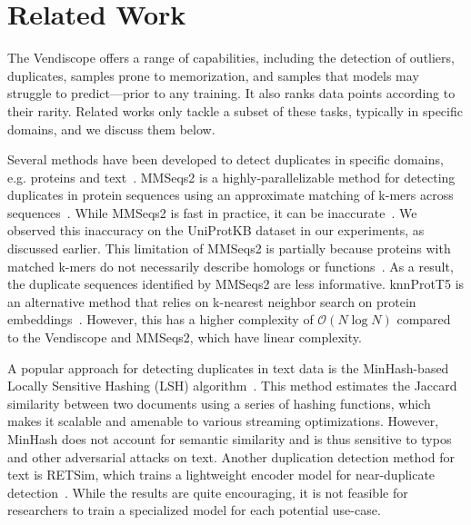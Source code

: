 \section{Related Work}
\label{sec:related}

The Vendiscope offers a range of capabilities, including the detection of outliers, duplicates, samples prone to memorization, and samples that models may struggle to predict---prior to any training. It also ranks data points according to their rarity. Related works only tackle a subset of these tasks, typically in specific domains, and we discuss them below.

 Several methods have been developed to detect duplicates in specific domains, e.g. proteins and text~\citep{kocetkov2022stack, lee2021deduplicating, steinegger2018clustering, zhang2023retsim}. MMSeqs2 is a highly-parallelizable method for detecting duplicates in protein sequences using an approximate matching of k-mers across sequences~\citep{steinegger2018clustering}. While MMSeqs2 is fast in practice, it can be inaccurate~\citep{schutze2022nearest, ou2023recent}. We observed this inaccuracy on the UniProtKB dataset in our experiments, as discussed earlier. This limitation of MMSeqs2 is partially because proteins with matched k-mers do not necessarily describe homologs or functions~\citep{schutze2022nearest, villegas2021unsupervised}. As a result, the duplicate sequences identified by MMSeqs2 are less informative. knnProtT5 is an alternative method that relies on k-nearest neighbor search on protein embeddings~\citep{schutze2022nearest}. However, this has a higher complexity of $\mathcal{O}(N\log N)$ compared to the Vendiscope and MMSeqs2, which have linear complexity. 

A popular approach for detecting duplicates in text data is the MinHash-based Locally Sensitive Hashing (LSH) algorithm~\citep{lee2021deduplicating, kocetkov2022stack}. This method estimates the Jaccard similarity between two documents using a series of hashing functions, which makes it scalable and amenable to various streaming optimizations. However, MinHash does not account for semantic similarity and is thus sensitive to typos and other adversarial attacks on text. Another duplication detection method for text is RETSim, which trains a lightweight encoder model for near-duplicate detection~\citep{zhang2023retsim}. While the results are quite encouraging, it is not feasible for researchers to train a specialized model for each potential use-case. 

